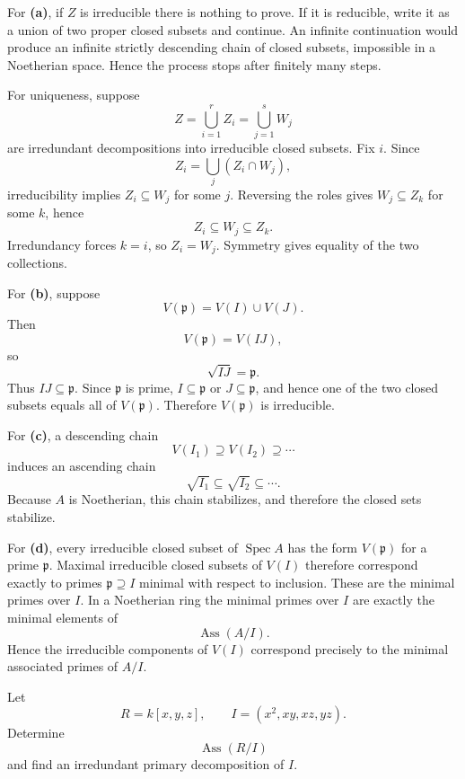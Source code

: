 \begin{solution}
For \textbf{(a)}, if \(Z\) is irreducible there is nothing to prove. If it is
reducible, write it as a union of two proper closed subsets and continue.
An infinite continuation would produce an infinite strictly descending chain
of closed subsets, impossible in a Noetherian space. Hence the process stops
after finitely many steps.

For uniqueness, suppose
\[
Z=\bigcup_{i=1}^r Z_i=\bigcup_{j=1}^s W_j
\]
are irredundant decompositions into irreducible closed subsets. Fix \(i\).
Since
\[
Z_i=\bigcup_j(Z_i\cap W_j),
\]
irreducibility implies \(Z_i\subseteq W_j\) for some \(j\). Reversing the
roles gives \(W_j\subseteq Z_k\) for some \(k\), hence
\[
Z_i\subseteq W_j\subseteq Z_k.
\]
Irredundancy forces \(k=i\), so \(Z_i=W_j\). Symmetry gives equality of the
two collections.

For \textbf{(b)}, suppose
\[
V(\mathfrak p)=V(I)\cup V(J).
\]
Then
\[
V(\mathfrak p)=V(IJ),
\]
so
\[
\sqrt{IJ}=\mathfrak p.
\]
Thus \(IJ\subseteq\mathfrak p\). Since \(\mathfrak p\) is prime,
\(I\subseteq\mathfrak p\) or \(J\subseteq\mathfrak p\), and hence one of the
two closed subsets equals all of \(V(\mathfrak p)\). Therefore
\(V(\mathfrak p)\) is irreducible.

For \textbf{(c)}, a descending chain
\[
V(I_1)\supseteq V(I_2)\supseteq\cdots
\]
induces an ascending chain
\[
\sqrt{I_1}\subseteq\sqrt{I_2}\subseteq\cdots.
\]
Because \(A\) is Noetherian, this chain stabilizes, and therefore the closed
sets stabilize.

For \textbf{(d)}, every irreducible closed subset of \(\operatorname{Spec}A\)
has the form \(V(\mathfrak p)\) for a prime \(\mathfrak p\). Maximal
irreducible closed subsets of \(V(I)\) therefore correspond exactly to primes
\(\mathfrak p\supseteq I\) minimal with respect to inclusion. These are the
minimal primes over \(I\). In a Noetherian ring the minimal primes over \(I\)
are exactly the minimal elements of
\[
\operatorname{Ass}(A/I).
\]
Hence the irreducible components of \(V(I)\) correspond precisely to the
minimal associated primes of \(A/I\).
\end{solution}


\begin{problem}[CP-V-0027]
\label{prob:cp-v-0027}
Let
\[
R=k[x,y,z],
\qquad
I=(x^2,xy,xz,yz).
\]
Determine
\[
\operatorname{Ass}(R/I)
\]
and find an irredundant primary decomposition of \(I\).
\end{problem}


